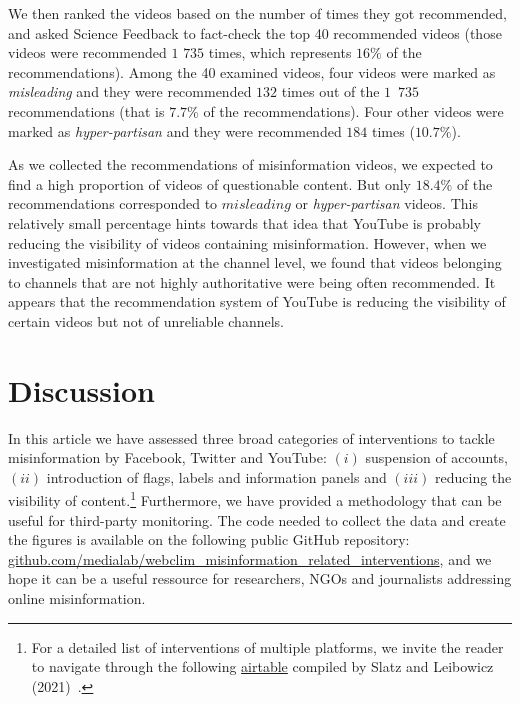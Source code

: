 \documentclass{article}
\begin{document}
\smallskip 

We then ranked the videos based on the number of times they got recommended, and asked Science Feedback to fact-check the top 40 recommended videos (those videos were recommended $1$ $735$ times, which represents $16\%$ of the recommendations).
Among the 40 examined videos, four videos were marked as {\it misleading} and they were recommended $132$ times out of the $1$~$735$ recommendations (that is $7.7\%$ of the recommendations).
Four other videos were marked as {\it hyper-partisan} and they were recommended $184$ times ($10.7\%$).

\smallskip 

As we collected the recommendations of misinformation videos, we expected to find a high proportion of videos of questionable content.
But only {$18.4\%$} of the recommendations corresponded to $misleading$ or {\it hyper-partisan} videos.
This relatively small percentage hints towards that idea that YouTube is probably reducing the visibility of videos containing misinformation.
However, when we investigated misinformation at the channel level, we found that videos belonging to channels that are not highly authoritative were being often recommended.
It appears that the recommendation system of YouTube is reducing the visibility of certain videos but not of unreliable channels.

\section{Discussion}

In this article we have assessed three broad categories of interventions to tackle misinformation by Facebook, Twitter and YouTube: $(i)$ suspension of accounts, $(ii)$ introduction of flags, labels and information panels and $(iii)$ reducing the visibility of content.\footnote{For a detailed list of interventions of multiple platforms, we invite the reader to navigate through the following \href{https://airtable.com/shrO0ooI9WSEfIUhb/tblAWQwFOiihKdQjm/viwZLAOzLK1NQ0c2n?blocks=hide}{airtable} compiled by Slatz and Leibowicz (2021)~\cite{niemanlab}.}
Furthermore, we have provided a methodology that can be useful for third-party monitoring. 
The code needed to collect the data and create the figures is available on the following public GitHub repository: \href{https://github.com/medialab/webclim_misinformation_related_interventions}{github.com/medialab/webclim\_misinformation\_related\_interventions}, and we hope it can be a useful ressource for researchers, NGOs and journalists addressing online misinformation. 
\end{document}
